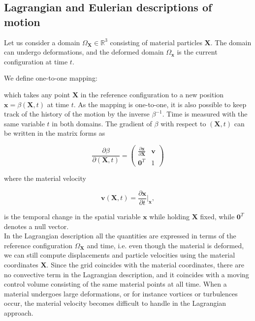 \documentclass[a4paper,11pt,openright,twoside]{book}
\begin{document}
\subsection{Lagrangian and Eulerian descriptions of motion}
Let us consider a domain $\Omega_{\mathbf{X}} \in \mathbb{R}^3$ consisting of material particles $\mathbf{X}$. The domain can undergo deformations, and the deformed domain $\Omega_\mathbf{x}$ is the current configuration at time $t$.


We define one-to-one mapping:


which takes any point $\mathbf{X}$ in the reference configuration to a new position $\mathbf{x} = \beta(\mathbf{X},t)$ at time $t$. As the mapping is one-to-one, it is also possible to keep track of the history of the motion by the inverse $\beta^{-1}$. Time is measured with the same variable $t$ in both domains. The gradient of $\beta$ with respect to $(\mathbf{X},t)$ can be written in the matrix forms as

\begin{equation}
\frac{\partial \beta}{\partial(\mathbf{X}, t)} = 
\begin{pmatrix}
\frac{\partial \mathbf{x}}{\partial \mathbf{X}} & \mathbf{v} \\
\mathbf{0}^T & 1
\end{pmatrix}
\end{equation}

where the material velocity

\begin{equation}
\mathbf{v}(\mathbf{X}, t) = \frac{\partial \mathbf{x}}{\partial t}|_\mathbf{x},
\end{equation}

is the temporal change in the spatial variable $\mathbf{x}$ while holding $\mathbf{X}$ fixed, while $\mathbf{0}^T$ denotes a null vector. \\
In the Lagrangian description all the quantities are expressed in terms of the reference configuration $\Omega_{\mathbf{X}}$ and time, i.e. even though the material is deformed, we can still compute displacements and particle velocities using the material coordinates $\mathbf{X}$.
Since the grid coincides with the material coordinates, there are no convective term in the Lagrangian description, and it coincides with a moving control volume consisting of the same material points at all time. When a material undergoes large deformations, or for instance vortices or turbulences occur, the material velocity becomes difficult to handle in the Lagrangian approach.
\end{document}
